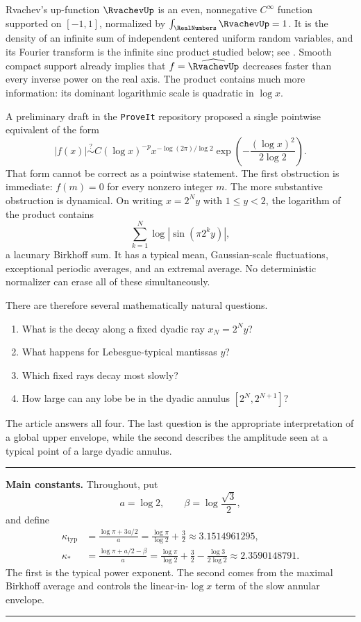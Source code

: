 \documentclass[11pt,oneside]{article}
\theoremstyle{definition}
\theoremstyle{remark}
\newenvironment{boxedremark}{%
  \par\smallskip\noindent\begin{center}\begin{minipage}{0.94\textwidth}%
  \color{black}\hrule\vspace{0.6em}\small
}{%
  \vspace{0.6em}\hrule\end{minipage}\end{center}\smallskip
}
\begin{document}
Rvachev's up-function $\RvachevUp$ is an even, nonnegative $C^\infty$ function
supported on $[-1,1]$, normalized by $\int_{\RealNumbers}\RvachevUp=1$.  It is the density of an
infinite sum of independent centered uniform random variables, and its Fourier
transform is the infinite sinc product studied below; see
\cite{arias1982,proveit,wikipedia}.  Smooth compact support already implies
that $f=\widehat{\RvachevUp}$ decreases faster than every inverse power on the real
axis.  The product contains much more information: its dominant logarithmic
scale is quadratic in $\log x$.

A preliminary draft in the \texttt{ProveIt} repository proposed a single
pointwise equivalent of the form
\begin{equation}
 |f(x)|\stackrel{?}{\sim}
 C(\log x)^{-p}x^{-\log(2\pi)/\log2}
 \exp\!\left(-\frac{(\log x)^2}{2\log2}\right).
 \label{eq:draft-form}
\end{equation}
That form cannot be correct as a pointwise statement.  The first obstruction is
immediate: $f(m)=0$ for every nonzero integer $m$.  The more substantive
obstruction is dynamical.  On writing $x=2^Ny$ with $1\le y<2$, the logarithm
of the product contains
\[
 \sum_{k=1}^{N}\log|\sin(\pi2^k y)|,
\]
a lacunary Birkhoff sum.  It has a typical mean, Gaussian-scale fluctuations,
exceptional periodic averages, and an extremal average.  No deterministic
normalizer can erase all of these simultaneously.

There are therefore several mathematically natural questions.
\begin{enumerate}
\item What is the decay along a fixed dyadic ray $x_N=2^Ny$?
\item What happens for Lebesgue-typical mantissas $y$?
\item Which fixed rays decay most slowly?
\item How large can any lobe be in the dyadic annulus $[2^N,2^{N+1}]$?
\end{enumerate}
The article answers all four.  The last question is the appropriate
interpretation of a global upper envelope, while the second describes the
amplitude seen at a typical point of a large dyadic annulus.

\begin{boxedremark}
\textbf{Main constants.}
Throughout, put
\[
 a=\log2,\qquad
 \beta=\log\frac{\sqrt3}{2},
\]
and define
\begin{align}
 \kappa_{\mathrm{typ}}
 &=\frac{\log\pi+3a/2}{a}
   =\frac{\log\pi}{\log2}+\frac32
   \approx3.1514961295,                                      \label{eq:ktyp}\\
 \kappa_*
 &=\frac{\log\pi+a/2-\beta}{a}
   =\frac{\log\pi}{\log2}+\frac32-
     \frac{\log3}{2\log2}
   \approx2.3590148791.                                      \label{eq:kstar}
\end{align}
The first is the typical power exponent.  The second comes from the maximal
Birkhoff average and controls the linear-in-$\log x$ term of the slow annular
envelope.
\end{boxedremark}
\end{document}
